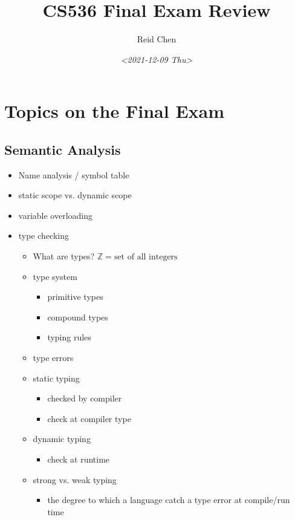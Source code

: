 \documentclass[11pt]{article}
\author{Reid Chen}
\date{\textit{<2021-12-09 Thu>}}
\title{CS536 Final Exam Review}
\begin{document}
\maketitle
\tableofcontents


\section{Topics on the Final Exam}
\label{sec:org654c28b}
\subsection{Semantic Analysis}
\label{sec:org4f3fc2e}
\begin{itemize}
\item Name analysis / symbol table
\item static scope vs. dynamic scope
\item variable overloading
\item type checking
\begin{itemize}
\item What are types? \(\mathbb{Z} = \text{set of all integers}\)
\item type system
\begin{itemize}
\item primitive types
\item compound types
\item typing rules
\end{itemize}
\item type errors
\item static typing
\begin{itemize}
\item checked by compiler
\item check at compiler type
\end{itemize}
\item dynamic typing
\begin{itemize}
\item check at runtime
\end{itemize}
\item strong vs. weak typing
\begin{itemize}
\item the degree to which a language catch a type error at compile/run time
\end{itemize}
\end{itemize}
\end{itemize}
\end{document}
